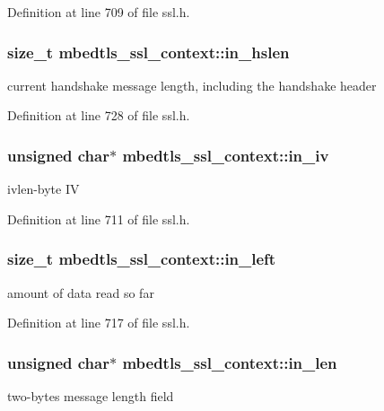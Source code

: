 Definition at line 709 of file ssl.\-h.

\hypertarget{structmbedtls__ssl__context_a8fa1f7b5ff4c594a3880e256a4044399}{
\subsubsection[{in\-\_\-hslen}]{\setlength{\rightskip}{0pt plus 5cm}size\-\_\-t mbedtls\-\_\-ssl\-\_\-context\-::in\-\_\-hslen}}\label{structmbedtls__ssl__context_a8fa1f7b5ff4c594a3880e256a4044399}
current handshake message length, including the handshake header 

Definition at line 728 of file ssl.\-h.

\hypertarget{structmbedtls__ssl__context_a77217f5c44f1ad2518a873030278628d}{
\subsubsection[{in\-\_\-iv}]{\setlength{\rightskip}{0pt plus 5cm}unsigned char$\ast$ mbedtls\-\_\-ssl\-\_\-context\-::in\-\_\-iv}}\label{structmbedtls__ssl__context_a77217f5c44f1ad2518a873030278628d}
ivlen-\/byte I\-V 

Definition at line 711 of file ssl.\-h.

\hypertarget{structmbedtls__ssl__context_ae989f555c14b7c6286d7a4616860cb24}{
\subsubsection[{in\-\_\-left}]{\setlength{\rightskip}{0pt plus 5cm}size\-\_\-t mbedtls\-\_\-ssl\-\_\-context\-::in\-\_\-left}}\label{structmbedtls__ssl__context_ae989f555c14b7c6286d7a4616860cb24}
amount of data read so far 

Definition at line 717 of file ssl.\-h.

\hypertarget{structmbedtls__ssl__context_af7235ac32f8a336a7636c63af6ef2127}{
\subsubsection[{in\-\_\-len}]{\setlength{\rightskip}{0pt plus 5cm}unsigned char$\ast$ mbedtls\-\_\-ssl\-\_\-context\-::in\-\_\-len}}\label{structmbedtls__ssl__context_af7235ac32f8a336a7636c63af6ef2127}
two-\/bytes message length field 

